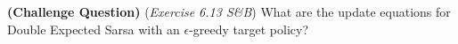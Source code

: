 \textbf{(Challenge Question)}
(\textit{Exercise 6.13 S\&B})
What are the update equations for Double Expected Sarsa with an $\epsilon$-greedy target policy?



